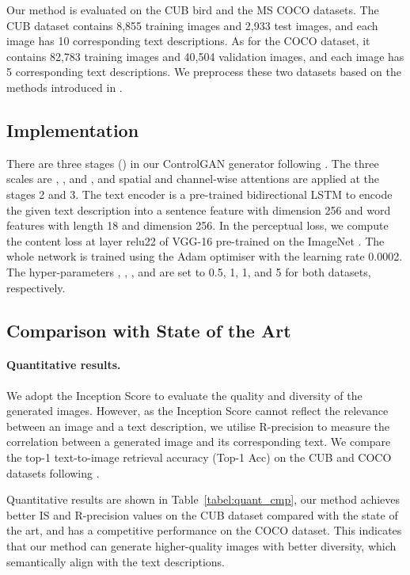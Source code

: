 \documentclass{article}
\begin{document}
Our method is evaluated on the CUB bird \citep{wah2011caltech} and the MS COCO \citep{lin2014microsoft} datasets. The CUB dataset contains 8,855 training images and 2,933 test images, and each image has 10 corresponding text descriptions. As for the COCO dataset, it contains 82,783 training images and 40,504 validation images, and each image has 5 corresponding text descriptions. We preprocess these two datasets based on the methods introduced in \cite{zhang2017stackgan}.

\subsection{Implementation}

There are three stages () in our ControlGAN generator following \cite{xu2018attngan}. The three scales are , , and , and spatial and channel-wise attentions {are applied at the stages 2 and 3}. The text encoder is a pre-trained bidirectional LSTM \cite{schuster1997bidirectional} to encode the given text description into a sentence feature with dimension 256 and word features with length 18 and dimension 256. In the perceptual loss, we compute the content loss at layer relu22 of VGG-16 \cite{simonyan2014very} pre-trained on the ImageNet \cite{russakovsky2015imagenet}. The whole network is trained using the Adam optimiser \cite{kingma2014adam} with the learning rate 0.0002. The hyper-parameters , , , and  are set to 0.5, 1, 1, and 5 for both datasets, respectively. 

\subsection{Comparison with State of the Art}

\paragraph{Quantitative results.}
We adopt the Inception Score \cite{salimans2016improved} to evaluate the quality and diversity of the generated images.
However, as the Inception Score cannot reflect the relevance between an image and a text description, we utilise R-precision \cite{xu2018attngan} to measure the correlation between a generated image and its corresponding text.
 We compare the top-1 text-to-image retrieval accuracy (Top-1 Acc) on the CUB and COCO datasets following \cite{nam2018text}.

Quantitative results are shown in Table~\ref{tabel:quant_cmp}, our method achieves better IS and R-precision values on the CUB dataset compared with the state of the art, and has a competitive performance on the COCO dataset.
This indicates that our method can generate higher-quality images with better diversity, which semantically align with the text descriptions. 
\end{document}
